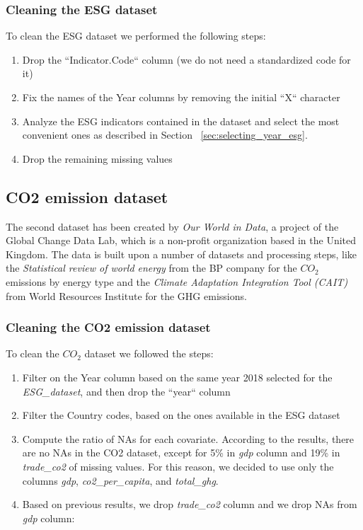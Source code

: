 \documentclass{article}
\begin{document}
	\subsubsection{Cleaning the ESG dataset}
	To clean the ESG dataset we performed the following steps:
	\begin{enumerate}
		\item Drop the ``Indicator.Code`` column (we do not need a standardized code for it)
		\item Fix the names of the Year columns by removing the initial ``X`` character
		\item Analyze the ESG indicators contained in the dataset and select the most convenient ones as described in Section ~\ref{sec:selecting_year_esg}.
		\item Drop the remaining missing values
	\end{enumerate}

	\subsection{CO2 emission dataset}
	The second dataset has been created by \textit{Our World in Data}, a project of the Global Change Data Lab, which is a non-profit organization based in the United Kingdom.
	The data is built upon a number of datasets and processing steps, like the \textit{Statistical review of world energy} from the BP company for the $CO_2$ emissions by energy type and the \textit{Climate Adaptation Integration Tool (CAIT)} from World Resources Institute for the GHG emissions.
	
	\subsubsection{Cleaning the CO2 emission dataset}
	To clean the $CO_2$ dataset we followed the steps:
	\begin{enumerate}
		\item Filter on the Year column based on the same year 2018 selected for the \textit{ESG\_dataset}, and then drop the ``year`` column
		\item Filter the Country codes, based on the ones available in the ESG dataset
		\item Compute the ratio of NAs for each covariate. 	According to the results, there are no NAs in the CO2 dataset, except 
		for 5\% in \textit{gdp} column and 19\% in \textit{trade\_co2} of missing values.
		For this reason, we decided to use only the columns \textit{gdp}, \textit{co2\_per\_capita}, and \textit{total\_ghg}.
		\item Based on previous results, we drop \textit{trade\_co2} column and we drop NAs from \textit{gdp} column:
	\end{enumerate}
	
\end{document}

